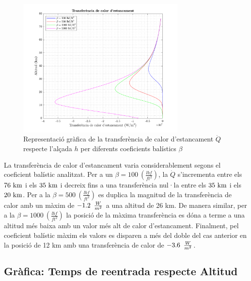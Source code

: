 \begin{figure}[ht]
    \centering
    \includegraphics[width=0.75\textwidth]{imagenes/01_ballistic_graficas/transferencia_calor_estancament.pdf}
    \caption{Representació gràfica de la transferència de calor d'estancament $\dot{Q}$ respecte l'alçada $h$ per diferents coeficients balístics $\beta$}
    \label{fig:transferencia_calor_estancament}
\end{figure}

La transferència de calor d'estancament varia considerablement segons el coeficient balístic analitzat. Per a un $\beta = 100 \ (\frac{lbf}{ft^2})$, la $\dot{Q}$ s'incrementa entre els $76 \ \kilo\meter$ i els $35 \ \kilo\meter$ i decreix fins a una transferència nul·la entre els $35 \ \kilo\meter$ i els $20 \ \kilo\meter$. Per a la $ \beta = 500 \ (\frac{lbf}{ft^2})$ es duplica la magnitud de la transferència de calor amb un màxim de $-1.2 \enskip \frac{W}{m^2}$ a una altitud de 26 km. De manera similar, per a la $ \beta = 1000 \ (\frac{lbf}{ft^2})$ la posició de la màxima transferència es dóna a terme a una altitud més baixa amb un valor més alt de calor d'estancament. Finalment, pel coeficient balístic màxim els valors es disparen a més del doble del cas anterior en la posició de 12 km amb una transferència de calor de $-3.6 \enskip \frac{W}{m^2}$.


\subsection{Gràfica: Temps de reentrada respecte Altitud}

